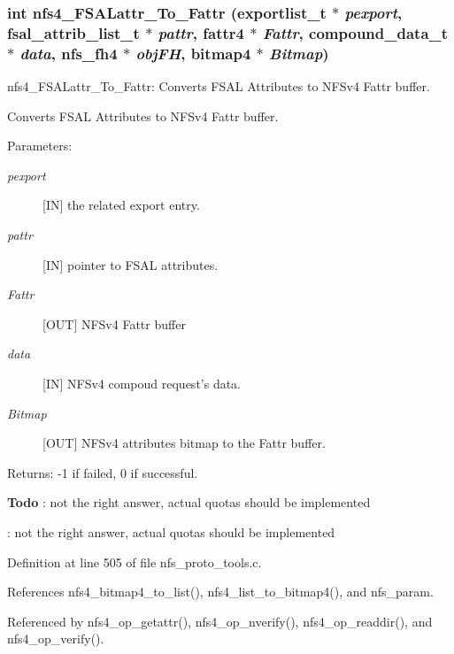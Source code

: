 \subsubsection{\setlength{\rightskip}{0pt plus 5cm}int nfs4\_\-FSALattr\_\-To\_\-Fattr (exportlist\_\-t $\ast$ {\em pexport}, fsal\_\-attrib\_\-list\_\-t $\ast$ {\em pattr}, fattr4 $\ast$ {\em Fattr}, compound\_\-data\_\-t $\ast$ {\em data}, nfs\_\-fh4 $\ast$ {\em obj\-FH}, bitmap4 $\ast$ {\em Bitmap})}\label{nfs__proto__tools_8c_a7}


nfs4\_\-FSALattr\_\-To\_\-Fattr: Converts FSAL Attributes to NFSv4 Fattr buffer.

Converts FSAL Attributes to NFSv4 Fattr buffer.

\begin{Desc}
\item[Parameters:]
\begin{description}
\item[{\em pexport}][IN] the related export entry. \item[{\em pattr}][IN] pointer to FSAL attributes. \item[{\em Fattr}][OUT] NFSv4 Fattr buffer \item[{\em data}][IN] NFSv4 compoud request's data. \item[{\em Bitmap}][OUT] NFSv4 attributes bitmap to the Fattr buffer.\end{description}
\end{Desc}
\begin{Desc}
\item[Returns:]-1 if failed, 0 if successful.\end{Desc}


\begin{Desc}
\item[{\bf Todo}]: not the right answer, actual quotas should be implemented 

: not the right answer, actual quotas should be implemented\end{Desc}


Definition at line 505 of file nfs\_\-proto\_\-tools.c.

References nfs4\_\-bitmap4\_\-to\_\-list(), nfs4\_\-list\_\-to\_\-bitmap4(), and nfs\_\-param.

Referenced by nfs4\_\-op\_\-getattr(), nfs4\_\-op\_\-nverify(), nfs4\_\-op\_\-readdir(), and nfs4\_\-op\_\-verify().
